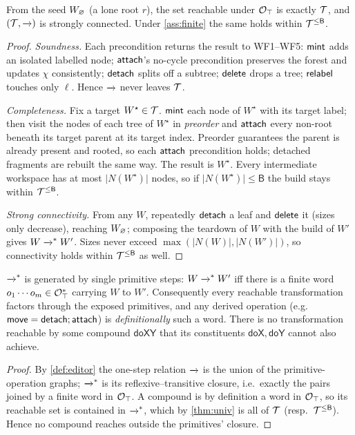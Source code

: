 \documentclass[../uxoxo-main]{subfiles}
\begin{document}
\begin{theorem}\label{thm:univ}
From the seed $W_{\varnothing}$ (a lone root $r$), the set reachable under $\mathcal{O}_\top$ is
exactly $\mathcal{T}$, and $(\mathcal{T},\xrightarrow{\,\,})$ is strongly connected. Under
\cref{ass:finite} the same holds within $\mathcal{T}^{\le\mathsf B}$.
\end{theorem}

\begin{proof}
\emph{Soundness.} Each precondition returns the result to WF1--WF5: $\mathsf{mint}$ adds
an isolated labelled node; $\mathsf{attach}$'s no-cycle precondition preserves the forest
and updates $\chi$ consistently; $\mathsf{detach}$ splits off a subtree; $\mathsf{delete}$ drops
a tree; $\mathsf{relabel}$ touches only $\ell$. Hence $\xrightarrow{\,\,}$ never leaves $\mathcal{T}$.

\emph{Completeness.} Fix a target $W^\star\in\mathcal{T}$. $\mathsf{mint}$ each node of
$W^\star$ with its target label; then visit the nodes of each tree of $W^\star$
in \emph{preorder} and $\mathsf{attach}$ every non-root beneath its target parent at its
target index. Preorder guarantees the parent is already present and rooted, so
each $\mathsf{attach}$ precondition holds; detached fragments are rebuilt the same way.
The result is $W^\star$. Every intermediate workspace has at most
$\lvert N(W^\star)\rvert$ nodes, so if $\lvert N(W^\star)\rvert\le\mathsf B$ the
build stays within $\mathcal{T}^{\le\mathsf B}$.

\emph{Strong connectivity.} From any $W$, repeatedly $\mathsf{detach}$ a leaf and
$\mathsf{delete}$ it (sizes only decrease), reaching $W_{\varnothing}$; composing the teardown of
$W$ with the build of $W'$ gives $W\xrightarrow{\,\,}^{*}W'$. Sizes never exceed
$\max(\lvert N(W)\rvert,\lvert N(W')\rvert)$, so connectivity holds within
$\mathcal{T}^{\le\mathsf B}$ as well.
\end{proof}

\begin{proposition}\label{prop:primitive}
$\xrightarrow{\,\,}^{*}$ is generated by single primitive steps: $W\xrightarrow{\,\,}^{*}W'$ iff there
is a finite word $o_1\cdots o_m\in\mathcal{O}_\top^{*}$ carrying $W$ to $W'$.
Consequently every reachable transformation factors through the exposed
primitives, and any derived operation (e.g.\ $\mathsf{move}=\mathsf{detach};\mathsf{attach}$) is
\emph{definitionally} such a word. There is no transformation reachable by some
compound $\mathsf{doXY}$ that its constituents $\mathsf{doX},\mathsf{doY}$ cannot
also achieve.
\end{proposition}

\begin{proof}
By \cref{def:editor} the one-step relation $\xrightarrow{\,\,}$ is the union of the
primitive-operation graphs; $\xrightarrow{\,\,}^{*}$ is its reflexive--transitive closure,
i.e.\ exactly the pairs joined by a finite word in $\mathcal{O}_\top$. A compound is by
definition a word in $\mathcal{O}_\top$, so its reachable set is contained in
$\xrightarrow{\,\,}^{*}$, which by \cref{thm:univ} is all of $\mathcal{T}$ (resp.\
$\mathcal{T}^{\le\mathsf B}$). Hence no compound reaches outside the primitives'
closure.
\end{proof}
\end{document}

